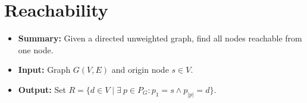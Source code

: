 \section{Reachability} \label{algorithm-reachability}
\begin{itemize}
    \item \textbf{Summary:} Given a directed unweighted graph, find all nodes reachable from one node.
    \item \textbf{Input:} Graph $G(V,E)$ and origin node $s \in V$.
    \item \textbf{Output:} Set $R=\{d \in V \mid \exists~p \in P_G\colon p_1 = s \wedge p_{|p|} = d\}$.
\end{itemize}

